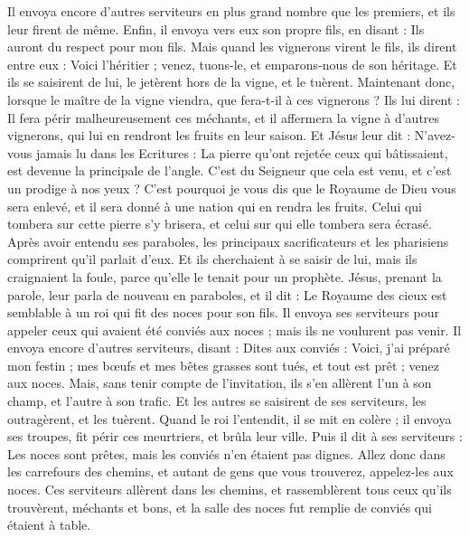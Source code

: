 \begin{multicols}{2}
Il envoya encore d'autres serviteurs en plus grand nombre que les premiers, et ils leur firent de même.
Enfin, il envoya vers eux son propre fils, en disant : Ils auront du respect pour mon fils.
Mais quand les vignerons virent le fils, ils dirent entre eux : Voici l'héritier ; venez, tuons-le, et emparons-nous de son héritage.
Et ils se saisirent de lui, le jetèrent hors de la vigne, et le tuèrent.
Maintenant donc, lorsque le maître de la vigne viendra, que fera-t-il à ces vignerons ?
Ils lui dirent : Il fera périr malheureusement ces méchants, et il affermera la vigne à d'autres vignerons, qui lui en rendront les fruits en leur saison.
Et Jésus leur dit : N'avez-vous jamais lu dans les Ecritures : La pierre qu’ont rejetée ceux qui bâtissaient, est devenue la principale de l’angle. C’est du Seigneur que cela est venu, et c’est un prodige à nos yeux{} ?
C'est pourquoi je vous dis que le Royaume de Dieu vous sera enlevé, et il sera donné à une nation qui en rendra les fruits.
Celui qui tombera sur cette pierre s’y brisera, et celui sur qui elle tombera sera écrasé.
Après avoir entendu ses paraboles, les principaux sacrificateurs et les pharisiens comprirent qu'il parlait d'eux.
Et ils cherchaient à se saisir de lui, mais ils craignaient la foule, parce qu’elle le tenait pour un prophète.
\VerseOne{}Jésus, prenant la parole, leur parla de nouveau en paraboles, et il dit :
Le Royaume des cieux est semblable à un roi qui fit des noces pour son fils.
Il envoya ses serviteurs pour appeler ceux qui avaient été conviés aux noces ; mais ils ne voulurent pas venir.
Il envoya encore d'autres serviteurs, disant : Dites aux conviés : Voici, j'ai préparé mon festin ; mes bœufs et mes bêtes grasses sont tués, et tout est prêt ; venez aux noces.
Mais, sans tenir compte de l’invitation, ils s’en allèrent l'un à son champ, et l'autre à son trafic.
Et les autres se saisirent de ses serviteurs, les outragèrent, et les tuèrent.
Quand le roi l'entendit, il se mit en colère ; il envoya ses troupes, fit périr ces meurtriers, et brûla leur ville.
Puis il dit à ses serviteurs : Les noces sont prêtes, mais les conviés n’en étaient pas dignes.
Allez donc dans les carrefours des chemins, et autant de gens que vous trouverez, appelez-les aux noces.
Ces serviteurs allèrent dans les chemins, et rassemblèrent tous ceux qu'ils trouvèrent, méchants et bons, et la salle des noces fut remplie de conviés qui étaient à table.

\end{multicols}
